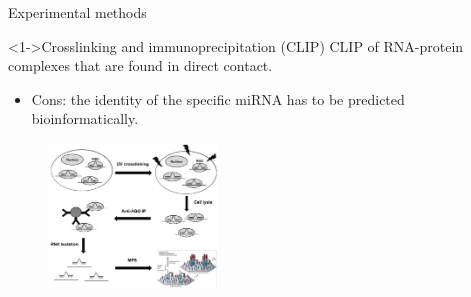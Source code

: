 \documentclass{beamer}
\begin{document}
\begin{frame}{Experimental methods}
		\begin{exampleblock}
				<1->{Crosslinking and immunoprecipitation (CLIP)}
			CLIP of RNA-protein complexes that are found in direct contact.
			\begin{itemize}
				\item Cons: the identity of the specific miRNA has to be predicted bioinformatically.
			\end{itemize}
		\end{exampleblock}
	
		\begin{figure}[hb!]
			\centering
			\includegraphics[width=0.4\textwidth]{images/clip-isana.png}
		\end{figure}

\end{frame}



\end{document}
